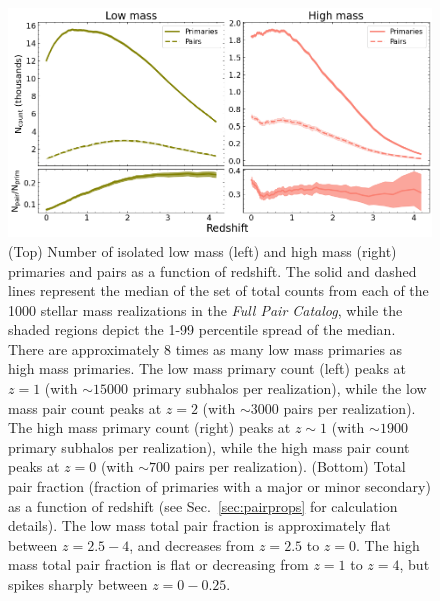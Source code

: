 \documentclass[twocolumn]{aastex631}
\newcommand{\paircat}{\textit{Full Pair Catalog}}
\begin{document}
\begin{figure}[htb]
    \centering
    \includegraphics[width=\textwidth]{counts_1000.png}
    \caption{(Top) Number of isolated low mass (left) and high mass (right) primaries and pairs as a function of redshift.
    The solid and dashed lines represent the median of the set of total counts from each of the 1000 stellar mass realizations in the \paircat, while the shaded regions depict the 1-99 percentile spread of the median.
    There are approximately 8 times as many low mass primaries as high mass primaries. 
    The low mass primary count (left) peaks at $z=1$ (with $\sim 15000$ primary subhalos per realization), while the low mass pair count peaks at $z=2$ (with $\sim 3000$ pairs per realization). 
    The high mass primary count (right) peaks at $z\sim1$ (with $\sim 1900$ primary subhalos per realization), while the high mass pair count peaks at $z=0$ (with $\sim 700$ pairs per realization). 
    (Bottom) Total pair fraction (fraction of primaries with a major or minor secondary) as a function of redshift (see Sec.~\ref{sec:pairprops} for calculation details).
    The low mass total pair fraction is approximately flat between $z=2.5-4$, and decreases from $z=2.5$ to $z=0$. 
    The high mass total pair fraction is flat or decreasing from $z=1$ to $z=4$, but spikes sharply between $z=0-0.25$.}
    \label{fig:counts}
\end{figure}
\end{document}

